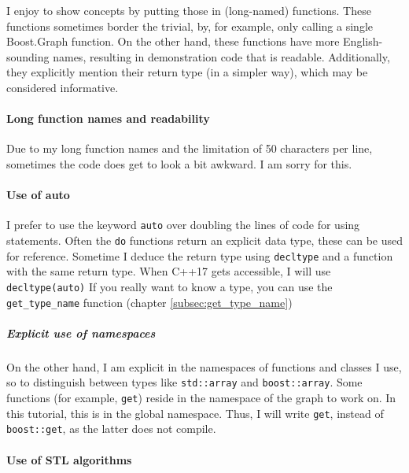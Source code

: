 I enjoy to show concepts by putting those in (long-named) functions.
These functions sometimes border the trivial, by, for example, only calling
a single Boost.Graph function.
On the other hand, these functions have more English-sounding names, resulting
in demonstration code that is readable.
Additionally, they explicitly mention their return type (in a simpler way),
which may be considered informative.

\paragraph{Long function names and readability}

Due to my long function names and the limitation of 50 characters per line,
sometimes the code does get to look a bit awkward.
I am sorry for this.

\paragraph{Use of auto}

I prefer to use the keyword \verb;auto; 
over doubling the lines of code for using
statements.
Often the \verb;do; functions return an explicit data type, 
these can be used for reference.
Sometime I deduce the return type using \verb;decltype; 
and a function with the same return type.
When C++17  
gets accessible, 
I will use 
\verb;decltype(auto); 
If you really want to know a type, 
you can use the 
\verb;get_type_name; function (chapter \ref{subsec:get_type_name})

\subparagraph{Explicit use of namespaces}

On the other hand, I am explicit in the namespaces of functions and classes
I use, so to distinguish between types 
like \verb;std::array; and \verb;boost::array;.
Some functions (for example, \verb;get;) reside 
in the namespace of the graph to work on.
In this tutorial, this is in the global namespace.
Thus, I will write \verb;get;, instead of \verb;boost::get;, 
as the latter does not compile.

\paragraph{Use of STL algorithms}

